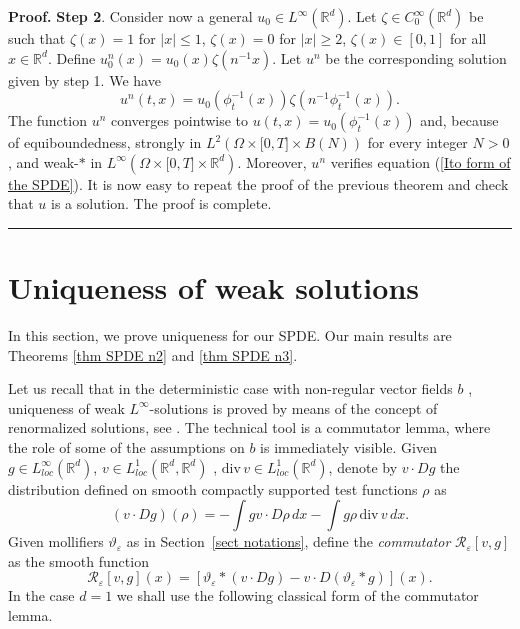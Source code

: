 \documentclass[a4paper,11pt]{article}
\newenvironment{proof}[1][Proof]{\textbf{#1.} }{\ \rule{0.5em}{0.5em}}
\begin{document}
\begin{proof}
\textbf{Step 2}. Consider now a general $u_{0}\in L^{\infty }({}{\mathbb{R}}%
^{d})$. Let $\zeta \in C_{0}^{\infty }(\mathbb{R}^{d})$ be such that $\zeta
(x)=1$ for $|x|\leq 1$, $\zeta (x)=0$ for $|x|\geq 2$, $\zeta (x)\in \left[
0,1\right] $ for all $x\in \mathbb{R}^{d}$. Define $u_{0}^{n}\left( x\right)
=u_{0}\left( x\right) \zeta (n^{-1}x)$. Let $u^{n}$ be the corresponding
solution given by step 1. We have
\begin{equation*}
u^{n}(t,x)=u_{0}(\phi _{t}^{-1}(x))\zeta (n^{-1}\phi _{t}^{-1}(x)).
\end{equation*}
The function $u^{n}$ converges pointwise to $u(t,x)=u_{0}(\phi _{t}^{-1}(x))
$ and, because of equiboundedness, strongly in $L^{2}(\Omega \times \lbrack
0,T]\times B\left( N\right) )$ for every integer $N>0$, and weak-$*$ in $%
L^{\infty }(\Omega \times \lbrack 0,T]\times \mathbb{R}^{d})$. Moreover, $%
u^{n}$ verifies equation (\ref{Ito form of the SPDE}). It is now easy to
repeat the proof of the previous theorem and check that $u$ is a solution.
The proof is complete.
\end{proof}








\section{Uniqueness of weak solutions}

\label{sec:uniq} In this section, we prove uniqueness for our SPDE.
Our main results are Theorems \ref{thm SPDE n2}
 and  \ref{thm SPDE n3}.





\medskip

Let us recall that in the deterministic case with non-regular vector fields $b$%
, uniqueness of weak $L^{\infty }$-solutions is proved by means of
the concept of renormalized solutions, see
\cite{DiPernaLions,Ambrosio}. The technical tool is a commutator
lemma, where the role of some of the
assumptions on $b$ is immediately visible. Given $g\in L_{loc}^{\infty }(%
\mathbb{R}^{d})$, $v\in L_{loc}^{1}(\mathbb{R}^{d},\mathbb{R}^{d})$ , $%
\mathrm{div}\,v\in L_{loc}^{1}(\mathbb{R}^{d})$, denote by $v\cdot
Dg$ the distribution defined on smooth compactly supported test
functions $\rho $ as
\begin{equation*}
(v\cdot Dg)(\rho )=-\int gv\cdot D\rho \,dx-\int g\rho
\,\mathrm{div}\,v\,dx.
\end{equation*}
Given mollifiers $\vartheta _{\varepsilon }$ as in Section~\ref{sect
notations}, define the \emph{commutator} $\mathcal{R}_{\varepsilon
}[v,g]$ as the smooth function
\begin{equation*}
\mathcal{R}_{\varepsilon }[v,g](x)=\left[ \vartheta _{\varepsilon
}\ast \left( v\cdot Dg\right) -v\cdot D\left( \vartheta
_{\varepsilon }\ast g\right) \right] \left( x\right) .
\end{equation*}
In the case $d=1$ we shall use the following classical form of the
commutator lemma.
\end{document}
